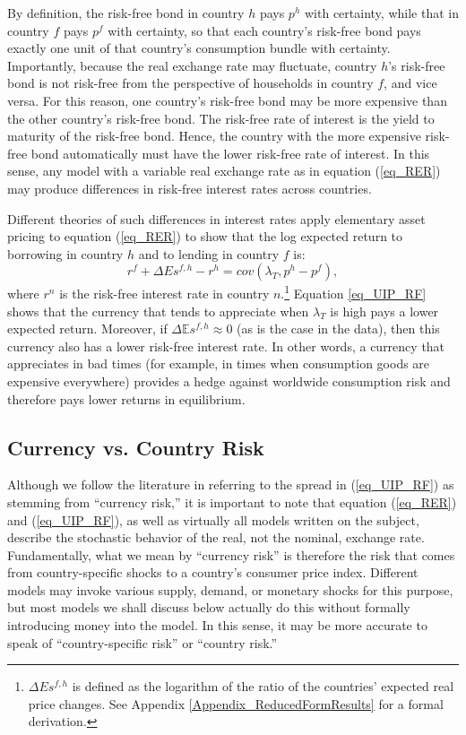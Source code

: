 \documentclass{ar-1col}
\begin{document}
By definition, the risk-free bond in country $h$ pays $p^h$ with certainty, while that in country $f$ pays $p^f$ with certainty, so that each country's risk-free bond pays exactly one unit of that country's consumption bundle with certainty. Importantly, because the real exchange rate may fluctuate, country $h$'s risk-free bond is not risk-free from the perspective of households in country $f$, and vice versa. For this reason, one country's risk-free bond may be more expensive than the other country's risk-free bond. The risk-free rate of interest is the yield to maturity of the risk-free bond.  Hence, the country with the more expensive risk-free bond automatically must have the lower risk-free rate of interest. In this sense, any model with a variable real exchange rate as in equation (\ref{eq_RER}) may produce differences in risk-free interest rates across countries.

Different theories of such differences in interest rates apply elementary asset pricing to equation (\ref{eq_RER}) to show that the log expected return to borrowing in country $h$ and to lending in country $f$ is:
\begin{equation}
  r^{f} + \Delta E s^{f,h} - r^{h} 
  = cov \left( \lambda _{T}, p^{h}-p^{f}\right),
  \label{eq_UIP_RF}
\end{equation}%
where $r^{n}$ is the risk-free interest rate in country $n$.\footnote{$\Delta E s^{f,h}$ is defined as the logarithm of the ratio of the countries' expected real price changes. See Appendix \ref{Appendix_ReducedFormResults} for a formal derivation.} Equation \eqref{eq_UIP_RF} shows that the currency that tends to appreciate when $\lambda_T$ is high pays a lower expected return. Moreover, if $\Delta \mathbb{E} s^{f,h}\approx0$ (as is the case in the data), then this currency also has a lower risk-free interest rate. In other words, a currency that appreciates in bad times (for example, in times when consumption goods are expensive everywhere) provides a hedge against worldwide consumption risk and therefore pays lower returns in equilibrium.

\begin{textbox}[]
\section{Currency vs. Country Risk}
Although we follow the literature in referring to the spread in (\ref{eq_UIP_RF}) as stemming from ``currency risk,'' it is important to note that equation (\ref{eq_RER}) and (\ref{eq_UIP_RF}), as well as virtually all models written on the subject, describe the stochastic behavior of the real, not the nominal, exchange rate. Fundamentally, what we mean by ``currency risk'' is therefore the risk that comes from country-specific shocks to a country's consumer price index. Different models may invoke various supply, demand, or monetary shocks for this purpose, but most models we shall discuss below actually do this without formally introducing money into the model. In this sense, it may be more accurate to speak of ``country-specific risk'' or ``country risk.'' 
\end{textbox}
\end{document}
